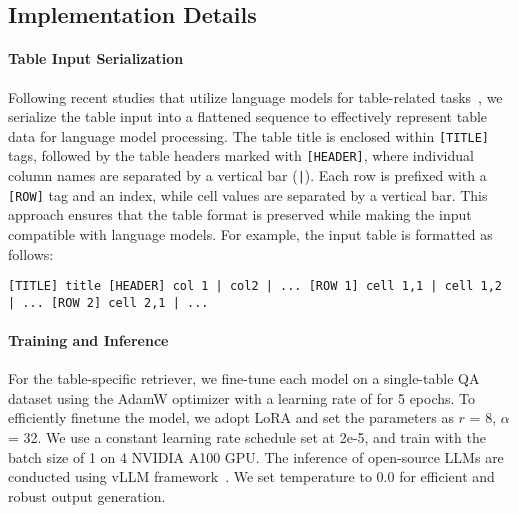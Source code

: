 \subsection{Implementation Details}

\paragraph{Table Input Serialization}
Following recent studies that utilize language models for table-related tasks~\citep{chen2023largelanguagemodelsfew1shot,Seo2024UnveilingIT}, we serialize the table input into a flattened sequence to effectively represent table data for language model processing.
The table title is enclosed within \texttt{[TITLE]} tags, followed by the table headers marked with \texttt{[HEADER]}, where individual column names are separated by a vertical bar (\texttt{|}).
Each row is prefixed with a \texttt{[ROW]} tag and an index, while cell values are separated by a vertical bar.
This approach ensures that the table format is preserved while making the input compatible with language models.
For example, the input table is formatted as follows:

\begingroup
\spaceskip=3pt
\texttt{[TITLE] title [HEADER] col 1 | col2 | ... [ROW 1] cell 1,1 | cell 1,2 | ... [ROW 2]  cell 2,1 | ...}
\endgroup

\paragraph{Training and Inference}
For the table-specific retriever, we fine-tune each model on a single-table QA dataset using the AdamW optimizer with a learning rate of for 5 epochs. To efficiently finetune the model, we adopt LoRA and set the parameters as $r$ = 8, $\alpha$ = 32.  We use a constant learning rate schedule set at 2e-5, and train with the batch size of 1 on 4 NVIDIA A100 GPU. The inference of open-source LLMs are conducted using vLLM framework~\citep{kwon2023efficientmemorymanagementlarge}.  We set 
temperature to 0.0 for efficient and robust output generation.
